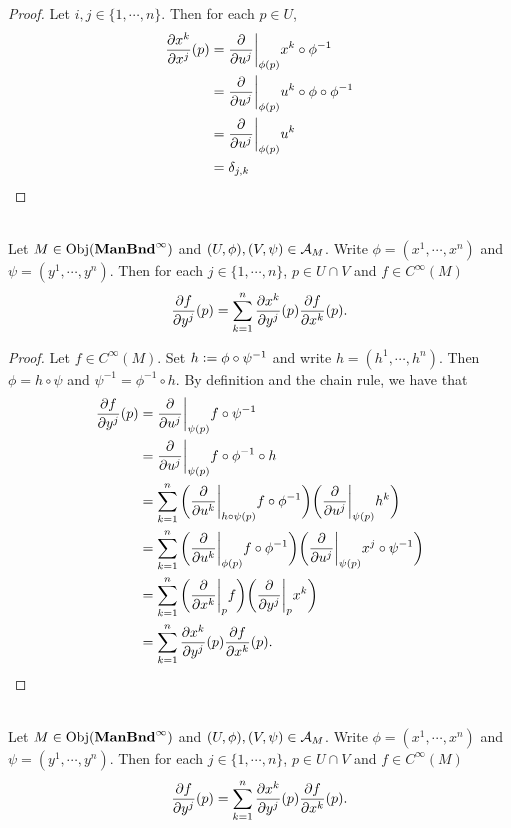 \documentclass{book}
\begin{document}
\begin{proof}
	Let $i,j \in \{1, \cdots, n\}$. Then for each $p \in U$,
	\begin{align*}
		\frac{\partial x^k}{\partial x^j} (p) 
		&=  \frac{\partial}{\partial u^j} \bigg|_{\phi(p)} x^k \circ \phi^{-1} \\
		&= \frac{\partial}{\partial u^j} \bigg|_{\phi(p)} u^k \circ \phi \circ \phi^{-1} \\
		&= \frac{\partial}{\partial u^j} \bigg|_{\phi(p)} u^k  \\
		&= \delta_{j, k}
	\end{align*}
\end{proof}

\begin{ex}  \\
	Let $M \in \operatorname{Obj}(\operatorname*{\text{\textbf{ManBnd}}^{\infty}})$ and $(U, \phi), (V, \psi) \in \mathcal{A}_M$. Write $\phi = (x^1, \cdots, x^n)$ and $\psi = (y^1, \cdots, y^n)$. Then for each $j \in \{1, \cdots, n\}$, $p \in U \cap V$ and $f \in C^{\infty}(M)$ 
	$$\frac{\partial f}{\partial y^j}(p) = \sum_{k =1}^n \frac{\partial x^k}{\partial y^j}(p)  \frac{\partial f}{\partial x^k}(p).$$
\end{ex}

\begin{proof}
	Let $f \in C^{\infty}(M)$. Set $h \vcentcolon= \phi \circ \psi^{-1}$ and write $h = (h^1, \cdots, h^n)$. Then $\phi = h \circ \psi$ and $\psi^{-1} = \phi^{-1} \circ h$. By definition and the chain rule, we have that 
	\begin{align*}
		\frac{\partial f}{\partial y^j} (p) 
		&= \frac{\partial}{\partial u^j} \bigg|_{\psi(p)} f \circ \psi^{-1} \\
		&= \frac{\partial}{\partial u^j} \bigg|_{\psi(p)} f \circ \phi^{-1} \circ h \\
		&= \sum_{k=1}^n \bigg(\frac{\partial}{\partial u^k} \bigg|_{h \circ \psi (p)} f \circ \phi^{-1} \bigg)  \bigg( \frac{\partial}{\partial u^j} \bigg|_{\psi(p)} h^k \bigg) \\
		&= \sum_{k=1}^n \bigg(\frac{\partial}{\partial u^k} \bigg|_{\phi (p)} f \circ \phi^{-1}  \bigg) \bigg( \frac{\partial}{\partial u^j} \bigg|_{\psi(p)} x^j \circ \psi^{-1} \bigg) \\
		&= \sum_{k=1}^n \bigg( \frac{\partial}{\partial x^k} \bigg|_p f \bigg)  \bigg(   \frac{\partial}{\partial y^j} \bigg|_p x^k  \bigg)\\
		& = \sum_{k =1}^n \frac{\partial x^k}{\partial y^j}(p)  \frac{\partial f}{\partial x^k}(p).
	\end{align*}
\end{proof}

\begin{ex}  \\
	Let $M \in \operatorname{Obj}(\operatorname*{\text{\textbf{ManBnd}}^{\infty}})$ and $(U, \phi), (V, \psi) \in \mathcal{A}_M$. Write $\phi = (x^1, \cdots, x^n)$ and $\psi = (y^1, \cdots, y^n)$. Then for each $j \in \{1, \cdots, n\}$, $p \in U \cap V$ and $f \in C^{\infty}(M)$ 
	$$\frac{\partial f}{\partial y^j}(p) = \sum_{k =1}^n \frac{\partial x^k}{\partial y^j}(p)  \frac{\partial f}{\partial x^k}(p).$$
\end{ex}
\end{document}
